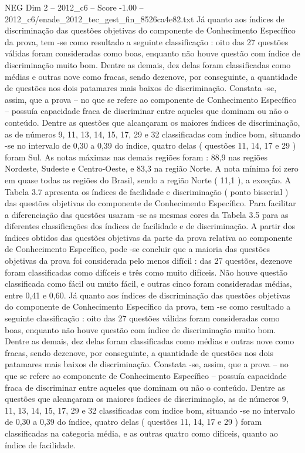 \begin{textsample}{NEG Dim 2 – 2012\_c6 – Score -1.00 – 2012\_c6/enade\_2012\_tec\_gest\_fin\_8526ca4e82.txt}
Já quanto aos índices de discriminação das questões objetivas do componente de Conhecimento Específico da prova, tem -se como resultado a seguinte classificação : oito das 27 questões válidas foram consideradas como boas, enquanto não houve questão com índice de discriminação muito bom.
Dentre as demais, dez delas foram classificadas como médias e outras nove como fracas, sendo dezenove, por conseguinte, a quantidade de questões nos dois patamares mais baixos de discriminação.
Constata -se, assim, que a prova – no que se refere ao componente de Conhecimento Específico – possuía capacidade fraca de discriminar entre aqueles que dominam ou não o conteúdo.
Dentre as questões que alcançaram os maiores índices de discriminação, as de números 9, 11, 13, 14, 15, 17, 29 e 32 classificadas com índice bom, situando -se no intervalo de 0,30 a 0,39 do índice, quatro delas ( questões 11, 14, 17 e 29 ) foram Sul.
As notas máximas nas demais regiões foram : 88,9 nas regiões Nordeste, Sudeste e Centro-Oeste, e 83,3 na região Norte.
A nota mínima foi zero em quase todas as regiões do Brasil, sendo a região Norte ( 11,1 ), a exceção.
A Tabela 3.7 apresenta os índices de facilidade e discriminação ( ponto bisserial ) das questões objetivas do componente de Conhecimento Específico.
Para facilitar a diferenciação das questões usaram -se as mesmas cores da Tabela 3.5 para as diferentes classificações dos índices de facilidade e de discriminação.
A partir dos índices obtidos das questões objetivas da parte da prova relativa ao componente de Conhecimento Específico, pode -se concluir que a maioria das questões objetivas da prova foi considerada pelo menos difícil : das 27 questões, dezenove foram classificadas como difíceis e três como muito difíceis.
Não houve questão classificada como fácil ou muito fácil, e outras cinco foram consideradas médias, entre 0,41 e 0,60.
Já quanto aos índices de discriminação das questões objetivas do componente de Conhecimento Específico da prova, tem -se como resultado a seguinte classificação : oito das 27 questões válidas foram consideradas como boas, enquanto não houve questão com índice de discriminação muito bom.
Dentre as demais, dez delas foram classificadas como médias e outras nove como fracas, sendo dezenove, por conseguinte, a quantidade de questões nos dois patamares mais baixos de discriminação.
Constata -se, assim, que a prova – no que se refere ao componente de Conhecimento Específico – possuía capacidade fraca de discriminar entre aqueles que dominam ou não o conteúdo.
Dentre as questões que alcançaram os maiores índices de discriminação, as de números 9, 11, 13, 14, 15, 17, 29 e 32 classificadas com índice bom, situando -se no intervalo de 0,30 a 0,39 do índice, quatro delas ( questões 11, 14, 17 e 29 ) foram classificadas na categoria média, e as outras quatro como difíceis, quanto ao índice de facilidade.

\end{textsample}
